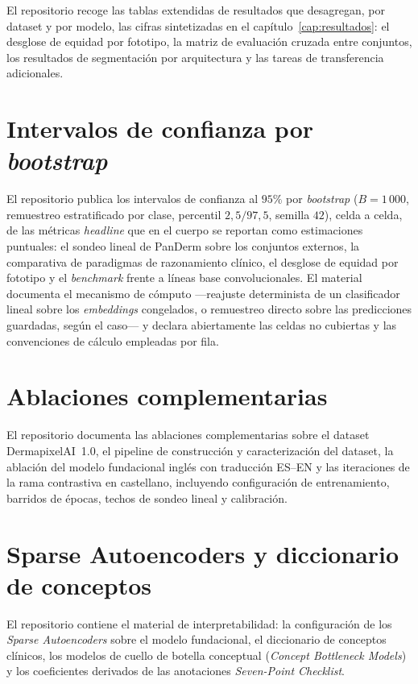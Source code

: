 El repositorio recoge las tablas extendidas de resultados que
desagregan, por dataset y por modelo, las cifras sintetizadas en el
capítulo~\ref{cap:resultados}: el desglose de equidad por fototipo,
la matriz de evaluación cruzada entre conjuntos, los resultados de
segmentación por arquitectura y las tareas de transferencia
adicionales.

\section{Intervalos de confianza por \emph{bootstrap}}
\label{sec:repo-bootstrap-ci}

El repositorio publica los intervalos de confianza al $95\%$ por
\emph{bootstrap} ($B = 1\,000$, remuestreo estratificado por clase,
percentil $2{,}5/97{,}5$, semilla $42$), celda a celda, de las
métricas \emph{headline} que en el cuerpo se reportan como
estimaciones puntuales: el sondeo lineal de PanDerm sobre los
conjuntos externos, la comparativa de paradigmas de razonamiento
clínico, el desglose de equidad por fototipo y el \emph{benchmark}
frente a líneas base convolucionales. El material documenta el
mecanismo de cómputo ---reajuste determinista de un clasificador
lineal sobre los \emph{embeddings} congelados, o remuestreo directo
sobre las predicciones guardadas, según el caso--- y declara
abiertamente las celdas no cubiertas y las convenciones de cálculo
empleadas por fila.

\section{Ablaciones complementarias}
\label{sec:repo-ablaciones}

El repositorio documenta las ablaciones complementarias sobre el
dataset DermapixelAI~1.0, el pipeline de construcción y
caracterización del dataset, la ablación del modelo fundacional
inglés con traducción ES--EN y las iteraciones de la rama
contrastiva en castellano, incluyendo configuración de
entrenamiento, barridos de épocas, techos de sondeo lineal y
calibración.

\section{Sparse Autoencoders y diccionario de conceptos}
\label{sec:repo-sae}

El repositorio contiene el material de interpretabilidad: la
configuración de los \emph{Sparse Autoencoders} sobre el modelo
fundacional, el diccionario de conceptos clínicos, los modelos de
cuello de botella conceptual (\emph{Concept Bottleneck Models}) y
los coeficientes derivados de las anotaciones \emph{Seven-Point
Checklist}.

